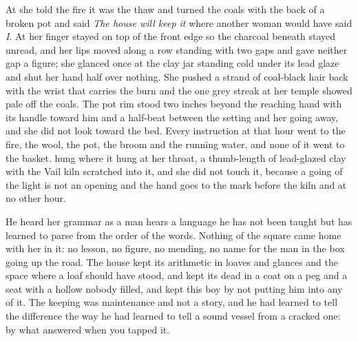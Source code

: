 At  she told the fire it was the thaw and turned the coals with the back of a broken pot and said \emph{The house will keep it} where another woman would have said \emph{I}. At  her finger stayed on top of the front edge so the charcoal beneath stayed unread, and her lips moved along a row standing with two gaps and gave neither gap a figure; she glanced once at the clay jar standing cold under its lead glaze and shut her hand half over nothing. She pushed a strand of coal-black hair back with the wrist that carries the burn and the one grey streak at her temple showed pale off the coals. The pot rim stood two inches beyond the reaching hand with its handle toward him and a half-beat between the setting and her going away, and she did not look toward the bed. Every instruction at that hour went to the fire, the wool, the pot, the broom and the running water, and none of it went to the basket.  hung where it hung at her throat, a thumb-length of lead-glazed clay with the Vail kiln scratched into it, and she did not touch it, because a going of the light is not an opening and the hand goes to the mark before the kiln and at no other hour.

He heard her grammar as a man hears a language he has not been taught but has learned to parse from the order of the words. Nothing of the square came home with her in it: no lesson, no figure, no mending, no name for the man in the box going up the road. The house kept its arithmetic in loaves and glances and the space where a loaf should have stood, and kept its dead in a coat on a peg and a seat with a hollow nobody filled, and kept this boy by not putting him into any of it. The keeping was maintenance and not a story, and he had learned to tell the difference the way he had learned to tell a sound vessel from a cracked one: by what answered when you tapped it.

\scenebreak

